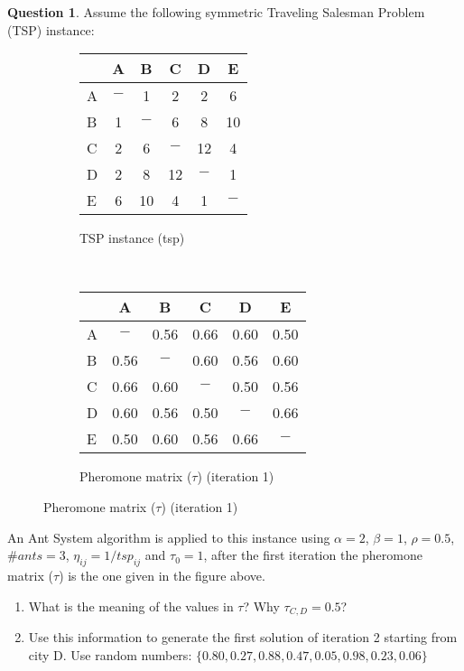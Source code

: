 \documentclass[11pt,a4paper]{article}
\theoremstyle{definition}%
\newtheorem{Q}{Question}[] %
\begin{document}
\begin{Q}
 Assume the following symmetric Traveling Salesman Problem (TSP)
 instance:
   \begin{figure}[ht]
   \begin{subfigure}{0.31\textwidth}
   \begin{tabular} {| l | c |c | c | c | c |}
   \hline
        &  A  &  B  &  C  &  D  & E   \\
    \hline
      A & $-$ &  1  &  2  &  2  & 6   \\
      B &  1  & $-$ &  6  &  8  & 10  \\  
      C &  2  &  6  & $-$ &  12 & 4   \\
      D &  2  &  8  & 12  & $-$ & 1   \\
      E &  6  & 10  &  4  &   1 & $-$  \\
    \hline
   \end{tabular}
   \caption{TSP instance (tsp)}
   \end{subfigure}
   ~~~~~~~~
   \begin{subfigure}{0.45\textwidth}
   \centering
   \begin{tabular} {| l | c |c | c | c | c |}
   \hline
        &  A  &  B  &  C  &  D  & E   \\
    \hline
      A & $-$    &  0.56  &  0.66  &  0.60  & 0.50   \\
      B &  0.56  & $-$    &  0.60  &  0.56  & 0.60  \\  
      C &  0.66  &  0.60  & $-$    &  0.50  & 0.56   \\
      D &  0.60  &  0.56  &  0.50  & $-$    & 0.66   \\
      E &  0.50  &  0.60  &  0.56  &  0.66  & $-$  \\
    \hline
   \end{tabular}
   \caption{Pheromone matrix ($\tau$) (iteration 1) }
   \end{subfigure}
   \end{figure}
   
   An Ant System algorithm is applied to this instance using $\alpha=2$, $\beta=1$, $\rho=0.5$, $\#ants=3$, $\eta_{ij}=1/tsp_{ij}$ and $\tau_0=1$, 
   after the first iteration the pheromone matrix ($\tau$) is the one given in the figure above. 
 \begin{enumerate}
     \item What is the meaning of the values in $\tau$? Why $\tau_{C,D}=0.5$?
     \item Use this information to generate the first solution of 
     iteration 2 starting from city D. Use random numbers: $\{0.80, 0.27, 0.88, 0.47, 0.05, 0.98, 0.23, 0.06 \}$
     

\end{enumerate}
\end{Q}
\end{document}
